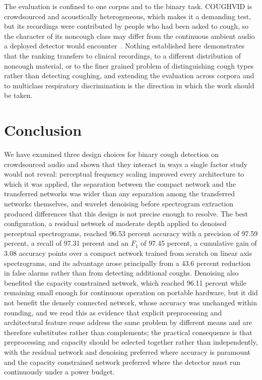 \documentclass[pdflatex,sn-mathphys-num]{sn-jnl}
\begin{document}
The evaluation is confined to one corpus and to the binary task. COUGHVID is
crowdsourced and acoustically heterogeneous, which makes it a demanding test,
but its recordings were contributed by people who had been asked to cough, so
the character of its noncough class may differ from the continuous ambient
audio a deployed detector would encounter~\cite{orlandic2021}. Nothing
established here demonstrates that the ranking transfers to clinical
recordings, to a different distribution of noncough material, or to the finer
grained problem of distinguishing cough types rather than detecting coughing,
and extending the evaluation across corpora and to multiclass respiratory
discrimination is the direction in which the work should be taken.

\section{Conclusion}\label{sec:conclusion}

We have examined three design choices for binary cough detection on
crowdsourced audio and shown that they interact in ways a single factor study
would not reveal: perceptual frequency scaling improved every architecture to
which it was applied, the separation between the compact network and the
transferred networks was wider than any separation among the transferred
networks themselves, and wavelet denoising before spectrogram extraction
produced differences that this design is not precise enough to resolve. The best
configuration, a residual network of moderate depth applied to denoised
perceptual spectrograms, reached 96.53 percent accuracy with a precision of
97.59 percent, a recall of 97.31 percent and an $F_1$ of 97.45 percent, a
cumulative gain of 3.08 accuracy points over a compact network trained from
scratch on linear axis spectrograms, and its advantage arose principally from
a 43.6 percent reduction in false alarms rather than from detecting additional
coughs. Denoising also benefited the capacity constrained network, which
reached 96.11 percent while remaining small enough for continuous operation on
portable hardware, but it did not benefit the densely connected network, whose
accuracy was unchanged within rounding, and we read this as evidence that
explicit preprocessing and architectural feature reuse address the same
problem by different means and are therefore substitutes rather than
complements; the practical consequence is that preprocessing and capacity
should be selected together rather than independently, with the residual
network and denoising preferred where accuracy is paramount and the capacity
constrained network preferred where the detector must run continuously under a
power budget.
\end{document}
